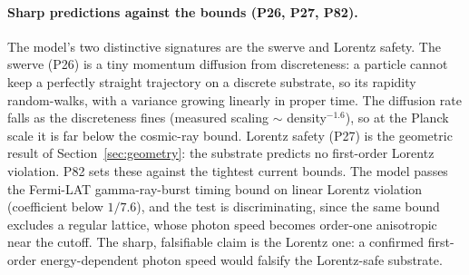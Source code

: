 \paragraph{Sharp predictions against the bounds (P26, P27, P82).}
The model's two distinctive signatures are the swerve and Lorentz safety. The swerve (P26) is a tiny
momentum diffusion from discreteness: a particle cannot keep a perfectly straight trajectory on a
discrete substrate, so its rapidity random-walks, with a variance growing linearly in proper time.
The diffusion rate falls as the discreteness fines (measured scaling $\sim$ density$^{-1.6}$), so at
the Planck scale it is far below the cosmic-ray bound. Lorentz safety (P27) is the geometric result
of Section~\ref{sec:geometry}: the substrate predicts no first-order Lorentz violation. P82 sets
these against the tightest current bounds. The model passes the Fermi-LAT gamma-ray-burst timing
bound on linear Lorentz violation (coefficient below $1/7.6$), and the test is discriminating, since
the same bound excludes a regular lattice, whose photon speed becomes order-one anisotropic near the
cutoff. The sharp, falsifiable claim is the Lorentz one: a confirmed first-order energy-dependent
photon speed would falsify the Lorentz-safe substrate.

